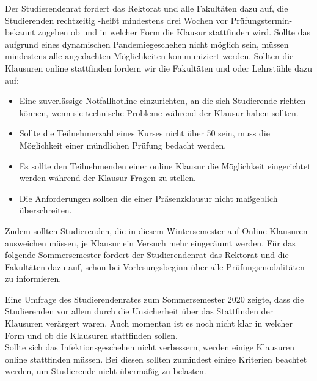     {
        Der Studierendenrat fordert das Rektorat und alle Fakultäten dazu auf, die
        Studierenden rechtzeitig
        -heißt mindestens drei Wochen vor Prüfungstermin- bekannt zugeben ob und in welcher
        Form die
        Klausur stattfinden wird. Sollte das aufgrund eines dynamischen Pandemiegeschehen
        nicht möglich
        sein, müssen mindestens alle angedachten Möglichkeiten kommuniziert werden.
        Sollten die Klausuren online stattfinden fordern wir die Fakultäten und oder
        Lehrstühle dazu auf:
        \begin{itemize}
            \item Eine zuverlässige Notfallhotline einzurichten, an die sich Studierende richten können, wenn sie technische Probleme während der Klausur haben sollten.
            \item Sollte die Teilnehmerzahl eines Kurses nicht über 50 sein, muss die Möglichkeit einer mündlichen Prüfung bedacht werden.
            \item Es sollte den Teilnehmenden einer online Klausur die Möglichkeit eingerichtet werden während der Klausur Fragen zu stellen.
            \item Die Anforderungen sollten die einer Präsenzklausur nicht maßgeblich überschreiten.  
        \end{itemize}
        Zudem sollten Studierenden, die in diesem Wintersemester auf Online-Klausuren
        ausweichen
        müssen, je Klausur ein Versuch mehr eingeräumt werden.
        Für das folgende Sommersemester fordert der Studierendenrat das Rektorat und die
        Fakultäten dazu
        auf, schon bei Vorlesungsbeginn über alle Prüfungsmodalitäten zu informieren.
    }{
        Eine Umfrage des Studierendenrates zum Sommersemester 2020 zeigte, dass die Studierenden vor
        allem durch die Unsicherheit über das Stattfinden der Klausuren verärgert waren. Auch momentan
        ist es noch nicht klar in welcher Form und ob die Klausuren stattfinden sollen.\\
        Sollte sich das Infektionsgeschehen nicht verbessern, werden einige Klausuren online stattfinden
        müssen. Bei diesen sollten zumindest einige Kriterien beachtet werden, um Studierende nicht
        übermäßig zu belasten. 
    }{
    }{
    }
